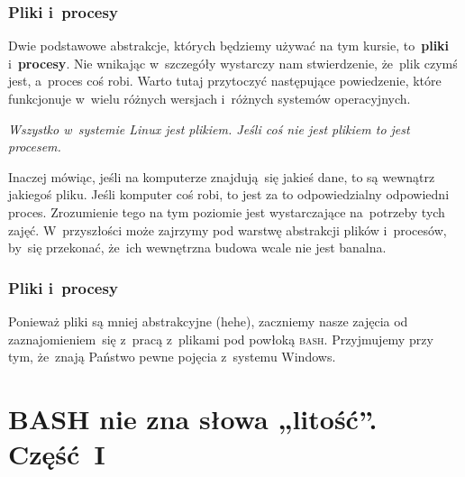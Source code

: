 \documentclass[10pt,t]{beamer}
\begin{document}
\begin{frame}
  \frametitle{Pliki i~procesy}


  Dwie podstawowe abstrakcje, których będziemy używać na tym kursie,
  to~\textbf{pliki} i~\textbf{procesy}. Nie wnikając w~szczegóły wystarczy
  nam stwierdzenie, że~plik czymś jest, a~proces coś robi. Warto tutaj
  przytoczyć następujące powiedzenie, które funkcjonuje w~wielu różnych
  wersjach i~różnych systemów operacyjnych.

  \textit{Wszystko w~systemie Linux jest plikiem. Jeśli coś nie jest
    plikiem to jest procesem.}

  Inaczej mówiąc, jeśli na komputerze znajdują~się jakieś dane, to są
  wewnątrz jakiegoś pliku. Jeśli komputer coś robi, to jest za to
  odpowiedzialny odpowiedni proces. Zrozumienie tego na tym poziomie jest
  wystarczające na~potrzeby tych zajęć. W~przyszłości może zajrzymy pod
  warstwę abstrakcji plików i~procesów, by~się przekonać, że~ich wewnętrzna
  budowa wcale nie jest banalna.

\end{frame}





\begin{frame}
  \frametitle{Pliki i~procesy}


  Ponieważ pliki są mniej abstrakcyjne (hehe), zaczniemy nasze zajęcia od
  zaznajomieniem~się z~pracą z~plikami pod powłoką \textsc{bash}.
  Przyjmujemy przy tym, że~znają Państwo pewne pojęcia z~systemu Windows.

\end{frame}










\section{BASH nie zna słowa „litość”. Część~I}
\end{document}
